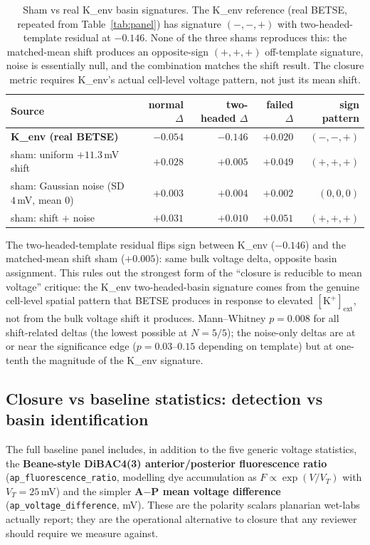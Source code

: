 \documentclass[11pt,a4paper]{article}
\begin{document}
\begin{table}[h]\centering\small
\caption{Sham vs real K\_env basin signatures. The K\_env reference (real BETSE, repeated from Table~\ref{tab:panel}) has signature $(-,-,+)$ with two-headed-template residual at $-0.146$. None of the three shams reproduces this: the matched-mean shift produces an opposite-sign $(+,+,+)$ off-template signature, noise is essentially null, and the combination matches the shift result. The closure metric requires K\_env's actual cell-level voltage pattern, not just its mean shift.}\label{tab:sham}
\begin{tabular}{lrrrr}\toprule
Source & normal $\Delta$ & two-headed $\Delta$ & failed $\Delta$ & sign pattern \\
\midrule
\textbf{K\_env (real BETSE)}                  & $\mathbf{-0.054}$ & $\mathbf{-0.146}$ & $+0.020$ & $(-,-,+)$ \\
sham: uniform $+11.3$\,mV shift               & $+0.028$ & $+0.005$ & $+0.049$ & $(+,+,+)$ \\
sham: Gaussian noise (SD $4$\,mV, mean $0$)   & $+0.003$ & $+0.004$ & $+0.002$ & $(0,0,0)$ \\
sham: shift $+$ noise                         & $+0.031$ & $+0.010$ & $+0.051$ & $(+,+,+)$ \\
\bottomrule\end{tabular}
\end{table}

The two-headed-template residual flips sign between K\_env ($-0.146$) and the matched-mean shift sham ($+0.005$): same bulk voltage delta, opposite basin assignment. This rules out the strongest form of the ``closure is reducible to mean voltage'' critique: the K\_env two-headed-basin signature comes from the genuine cell-level spatial pattern that BETSE produces in response to elevated $[\mathrm{K}^{+}]_{\mathrm{ext}}$, not from the bulk voltage shift it produces. Mann--Whitney $p=0.008$ for all shift-related deltas (the lowest possible at $N=5/5$); the noise-only deltas are at or near the significance edge ($p=0.03$--$0.15$ depending on template) but at one-tenth the magnitude of the K\_env signature.

\subsection{Closure vs baseline statistics: detection vs basin identification}\label{sec:baselines}

The full baseline panel includes, in addition to the five generic voltage statistics, the \textbf{Beane-style DiBAC4(3) anterior/posterior fluorescence ratio} (\texttt{ap\_fluorescence\_ratio}, modelling dye accumulation as $F\propto\exp(V/V_{T})$ with $V_{T}=25$\,mV) and the simpler \textbf{A$-$P mean voltage difference} (\texttt{ap\_voltage\_difference}, mV). These are the polarity scalars planarian wet-labs actually report; they are the operational alternative to closure that any reviewer should require we measure against.
\end{document}
